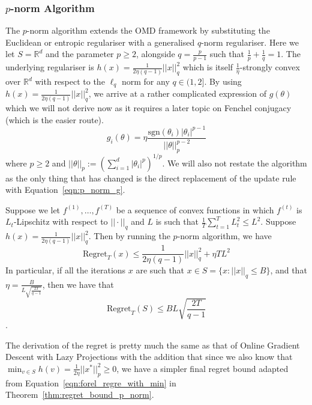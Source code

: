 \subsubsection{$p$-norm Algorithm}
The $p$-norm algorithm extends the OMD framework by substituting the Euclidean or entropic regulariser with a generalised $q$-norm regulariser. Here we let $S = \mathbb R^d$ and the parameter $p \geq 2$, alongside $q = \frac{p}{p-1}$ such that $\frac{1}{p} + \frac{1}{q} = 1$. The underlying regulariser is $h(x) = \frac{1}{2\eta(q-1)}||x||_q^2$ which is itself $\frac{1}{\eta}$-strongly convex over $\mathbb R^d$ with respect to the $\ell_q$ norm for any $q \in (1, 2]$. By using $h(x) = \frac{1}{2\eta (q-1)}||x||_q^2$, we arrive at a rather complicated expression of $g(\theta)$ which we will not derive now as it requires a later topic on Fenchel conjugacy (which is the easier route).
\begin{equation}\label{eqn:p_norm_g}
    g_i(\theta) = \eta \frac{\text{sgn}(\theta_i)  |\theta_i|^{p-1}}{||\theta||_p^{p-2}}
\end{equation} where $p \geq 2$ and $||\theta||_p := \left(\sum_{i=1}^d |\theta_i|^p\right)^{1/p}$. We will also not restate the algorithm as the only thing that has changed is the direct replacement of the update rule with Equation~\ref{eqn:p_norm_g}. 
\begin{theorem}\label{thm:regret_bound_p_norm}
Suppose we let $f^{(1)}, \ldots, f^{(T)}$ be a sequence of convex functions in which $f^{(t)}$ is $L_t$-Lipschitz with respect to $||\cdot||_q$ and $L$ is such that $\frac{1}{T}\sum_{t=1}^T L_t^2 \leq L^2$. Suppose $h(x) = \frac{1}{2\eta(q-1)}||x||_q^2$. Then by running the $p$-norm algorithm, we have
\begin{equation}
    \text{Regret}_T(x) \leq \frac{1}{2\eta (q - 1)}||x||_q^2 + \eta TL^2
\end{equation}
In particular, if all the iterations $x$ are such that $x \in S = \{x : ||x||_q \leq B\}$, and that $\eta = \frac{B}{L\sqrt{\frac{2T}{q-1}}}$, then we have that $$\text{Regret}_T(S) \leq BL\sqrt{\frac{2T}{q-1}}$$.
\end{theorem}
The derivation of the regret is pretty much the same as that of Online Gradient Descent with Lazy Projections with the addition that since we also know that $\min_{v \in S}h(v) = \frac{1}{2\eta}||x^*||_p^2 \geq 0$, we have a simpler final regret bound adapted from Equation~\ref{eqn:forel_regre_with_min} in Theorem~\ref{thm:regret_bound_p_norm}.

